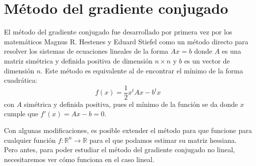 %

\section{Método del gradiente conjugado}

El método del gradiente conjugado fue desarrollado por primera vez por los matemáticos Magnus R. Hestenes y Eduard Stiefel\cite{hestenes-stiefel-1952} como un método directo para resolver los sistemas de ecuaciones lineales de la forma $Ax=b$ donde $A$ es una matriz simétrica y definida positiva de dimensión $n\times n$ y $b$ es un vector de dimensión $n$. Este método es equivalente al de encontrar el mínimo de la forma cuadrática:
\begin{equation}\label{funcion-objectivo-cuadratico} f(x) = \frac{1}{2} x^t A x - b^t x \end{equation}
con $A$ simétrica y definida positiva, pues el mínimo de la función se da donde $x$ cumple que $f'(x)=Ax-b=0$.

Con algunas modificaciones, es posible extender el método para que funcione para cualquier función $f : \mathbb{R}^n \to \mathbb{R}$ para el que podamos estimar su matriz hessiana. Pero antes, para poder estudiar el método del gradiente conjugado no lineal, necesitaremos ver cómo funciona en el caso lineal.

